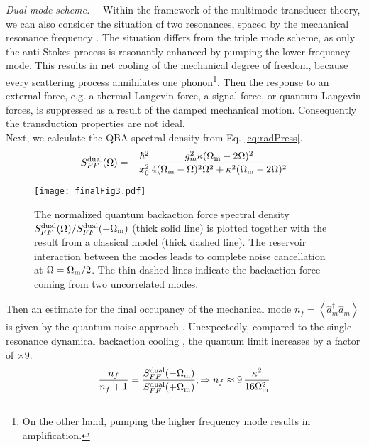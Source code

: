 \documentclass[twocolumn,english,aps,prl,superscriptaddress,showpacs,preprintnumbers]{revtex4}
\begin{document}
\textit{Dual mode scheme.}--- Within the framework of the multimode
transducer theory, we can also consider the situation of two resonances,
spaced by the mechanical resonance frequency \cite{braginsky_parametric_2001,matsko_sensitivity_2008}.
The situation differs from the triple mode scheme, as only the anti-Stokes
process is resonantly enhanced by pumping the lower frequency mode.
This results in net cooling of the mechanical degree of freedom, because
every scattering process annihilates one phonon\footnote{On the other hand, pumping the higher frequency mode results in amplification.}. Then the response to an external force, e.g. a thermal Langevin
force, a signal force, or quantum Langevin forces, is suppressed as a result of the damped mechanical motion.
Consequently the transduction properties are not ideal. \\
Next, we calculate the QBA spectral density from Eq. \ref{eq:radPress}.
\begin{eqnarray}
S_{FF}^{{\rm dual}}(\Omega) & = & \frac{\hbar^{2}}{x_{0}^{2}}\frac{g_{m}^{2}\kappa(\Omega_{\rm{m}}-2\Omega)^{2}}{4(\Omega_{\rm{m}}-\Omega)^{2}\Omega^{2}+\kappa^{2}(\Omega_{\rm{m}}-2\Omega)^{2}}\end{eqnarray}
\begin{figure}
\begin{centering}
\texttt{[image: finalFig3.pdf]} 
\par\end{centering}
\caption{The normalized quantum backaction force spectral density $S_{FF}^{{\rm dual}}(\Omega)/S_{FF}^{{\rm dual}}(+\Omega_{\rm{m}})$
(thick solid line) is plotted together with the result from a classical model (thick dashed line).
The reservoir interaction between the modes leads to complete noise
cancellation at $\Omega=\Omega_{\rm{m}}/2$. The thin dashed lines indicate
the backaction force coming from two uncorrelated modes. \label{fig:2}}

\end{figure}
Then an estimate for the final occupancy of the mechanical mode $n_{f}=\left\langle \hat{a}_{m}^{\dagger}\hat{a}_{m}\right\rangle $
is given by the quantum noise approach \cite{clerk_introduction_2008}.
Unexpectedly, compared to the single resonance dynamical backaction
cooling \citep{marquardt_quantum_2007,WilsonRae_theory_2007}, the
quantum limit increases by a factor of $\times9$.\begin{equation}
\frac{n_{f}}{n_{f}+1}=\frac{S_{FF}^{\rm{dual}}(-\Omega_{\rm{m}})}{S_{FF}^{\rm{dual}}(+\Omega_{\rm{m}})},\Rightarrow n_{f}\approx9\,\frac{\kappa^{2}}{16\Omega_{\rm{m}}^{2}}\label{eq:coolLimit}\end{equation}
\end{document}
